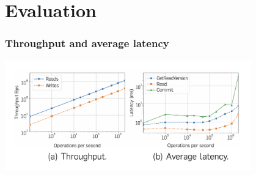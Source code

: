 \section{Evaluation}
\begin{frame}
    \frametitle{Throughput and average latency}
    \begin{center}
        \includegraphics[width=0.8\textwidth]{img/4-Evaluation/Throughput-Average latency.png}
    \end{center}
\end{frame}
